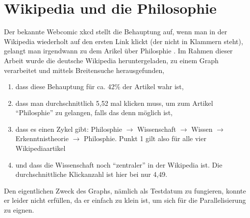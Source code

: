 \section{Wikipedia und die Philosophie} %
\label{sec:wikipedia_und_die_philosophie}
Der bekannte Webcomic xkcd stellt die Behauptung auf, wenn man in der Wikipedia wiederholt auf den ersten Link klickt (der nicht in Klammern steht), gelangt man irgendwann zu dem Arikel über Philosphie \cite{xkcd:Online}. Im Rahmen dieser Arbeit wurde die deutsche Wikipedia heruntergeladen, zu einem Graph verarbeitet und mittels Breitensuche herausgefunden,
\begin{enumerate}
	\item dass diese Behauptung für ca. 42\% der Artikel wahr ist,
	\item dass man durchschnittlich 5,52 mal klicken muss, um zum Artikel \enquote{Philosphie} zu gelangen, falls das denn möglich ist,
	\item dass es einen Zykel gibt: Philosphie $\rightarrow$ Wissenschaft $\rightarrow$ Wissen $\rightarrow$ Erkenntnistheorie $\rightarrow$ Philosphie. Punkt 1 gilt also für alle vier Wikipediaartikel
	\item und dass die Wissenschaft noch \enquote{zentraler} in der Wikipedia ist. Die durchschnittliche Klickanzahl ist hier bei nur 4,49.
\end{enumerate}
Den eigentlichen Zweck des Graphs, nämlich als Testdatum zu fungieren, konnte er leider nicht erfüllen, da er einfach zu klein ist, um sich für die Parallelisierung zu eignen.
